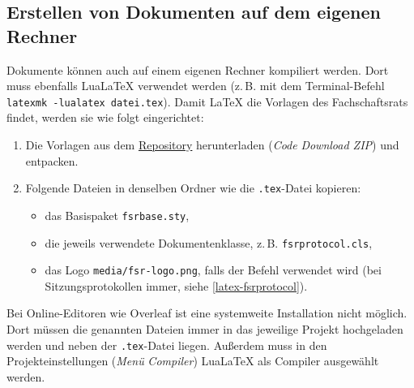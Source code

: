 \subsection{Erstellen von Dokumenten auf dem eigenen Rechner}
\label{latex-eigener-rechner}
Dokumente können auch auf einem eigenen Rechner kompiliert werden. Dort muss ebenfalls LuaLaTeX verwendet werden (z.\,B. mit dem Terminal-Befehl \texttt{latexmk -lualatex datei.tex}). Damit \LaTeX{} die Vorlagen des Fachschaftsrats findet, werden sie wie folgt eingerichtet:
\begin{enumerate}
	\item Die Vorlagen aus dem \href{https://github.com/fsrphysik-uds/latex-templates}{Repository} herunterladen (\textit{Code} \textrightarrow{} \textit{Download ZIP}) und entpacken.
	\item Folgende Dateien in denselben Ordner wie die \texttt{.tex}-Datei kopieren:
	      \begin{itemize}
		      \item das Basispaket \texttt{fsrbase.sty},
		      \item die jeweils verwendete Dokumentenklasse, z.\,B. \texttt{fsrprotocol.cls},
		      \item das Logo \texttt{media/fsr-logo.png}, falls der Befehl \texttt{\fsrlogo} verwendet wird (bei Sitzungsprotokollen immer, siehe \autoref{latex-fsrprotocol}).
	      \end{itemize}
\end{enumerate}


Bei Online-Editoren wie Overleaf ist eine systemweite Installation nicht möglich. Dort müssen die genannten Dateien immer in das jeweilige Projekt hochgeladen werden und neben der \texttt{.tex}-Datei liegen. Außerdem muss in den Projekteinstellungen (\textit{Menü} \textrightarrow{} \textit{Compiler}) LuaLaTeX als Compiler ausgewählt werden.
